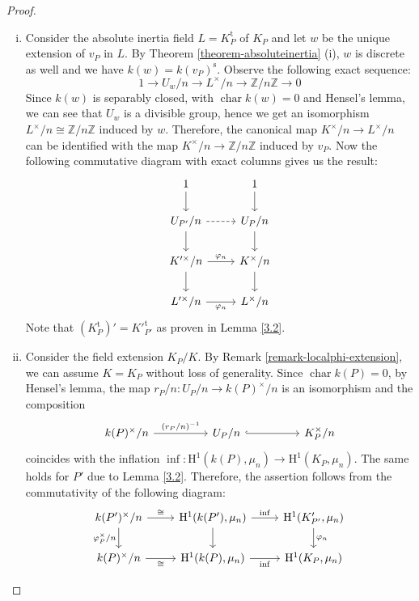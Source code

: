 \begin{proof}
\begin{enumerate}[(i)]
\item Consider the absolute inertia field $L = K_P^\text{t}$ of $K_P$ and let $w$ be the unique extension of $v_P$ in $L$. By Theorem \ref{theorem-absoluteinertia} (i), $w$ is discrete as well and we have $k(w) = k(v_P)^\text{s}$. Observe the following exact sequence:
\[ 1 \longrightarrow U_w/n \longrightarrow L^\times /n\longrightarrow \mathbb{Z}/n\mathbb{Z}\longrightarrow 0 \]
Since $k(w)$ is separably closed, with $\operatorname{char} k(w)=0$ and Hensel's lemma, we can see that $U_w$ is a divisible group, hence we get an isomorphism $L^\times /n\cong \mathbb{Z}/n\mathbb{Z}$ induced by $w$. Therefore, the canonical map $K^\times/n\to L^\times/n$ can be identified with the map $K^\times/n \to\mathbb{Z}/n\mathbb{Z}$ induced by $v_P$. Now the following commutative diagram with exact columns gives us the result:
\[ \begin{tikzcd}
1 \ar[d] & 1 \ar[d]\\
U_{P'}/n \ar[r, dashed]\ar[d] & U_P/n\ar[d]\\
K'^\times /n \ar[r, "\varphi_n"]\ar[d] & K^\times/n\ar[d]\\
L'^\times /n \ar[r, "\varphi_n"'] &  L^\times /n
\end{tikzcd}\]
Note that $(K^\text{t}_P)' = K'^{\text{t}}_{P'}$ as proven in Lemma \ref{3.2}.
\item Consider the field extension $K_P/K$. By Remark \ref{remark-localphi-extension}, we can assume $K=K_P$ without loss of generality. Since $\operatorname{char}k(P)=0$, by Hensel's lemma, the map $r_P/n: U_P/n\to k(P)^\times/n$ is an isomorphism and the composition
\[\begin{tikzcd}
k(P)^\times / n\ar[rr, "(r_P/n)^{-1}"] && U_P/n \ar[rr, hook] && K_P^\times/n
\end{tikzcd}\]
coincides with the inflation $\operatorname{inf}: \mathrm{H}^1(k(P), \mu_n) \to \mathrm{H}^1(K_P,\mu_n)$. The same holds for $P'$ due to Lemma \ref{3.2}. Therefore, the assertion follows from the commutativity of the following diagram:
\[ \begin{tikzcd}
k(P')^\times/n \ar[r, "\cong"] \ar[d, "\varphi_P^\times/n"'] & \mathrm{H}^1(k(P'),\mu_n) \ar[r, "\mathrm{inf}"] \ar[d]& \mathrm{H}^1(K'_{P'}, \mu_n) \ar[d, "\varphi_n"] \\
k(P)^\times/n \ar[r, "\cong"'] & \mathrm{H}^1(k(P),\mu_n)  \ar[r, "\mathrm{inf}"'] & \mathrm{H}^1(K_{P}, \mu_n)
\end{tikzcd}  \qedhere\]
\end{enumerate}
\end{proof}

